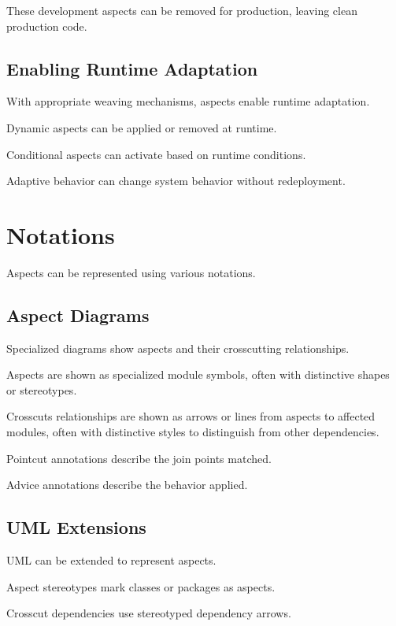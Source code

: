 \documentclass[11pt]{article}
\begin{document}
These development aspects can be removed for production, leaving clean production code.

\subsection{Enabling Runtime Adaptation}

With appropriate weaving mechanisms, aspects enable runtime adaptation.

Dynamic aspects can be applied or removed at runtime.

Conditional aspects can activate based on runtime conditions.

Adaptive behavior can change system behavior without redeployment.

\section{Notations}

Aspects can be represented using various notations.

\subsection{Aspect Diagrams}

Specialized diagrams show aspects and their crosscutting relationships.

Aspects are shown as specialized module symbols, often with distinctive shapes or stereotypes.

Crosscuts relationships are shown as arrows or lines from aspects to affected modules, often with distinctive styles to distinguish from other dependencies.

Pointcut annotations describe the join points matched.

Advice annotations describe the behavior applied.

\subsection{UML Extensions}

UML can be extended to represent aspects.

Aspect stereotypes mark classes or packages as aspects.

Crosscut dependencies use stereotyped dependency arrows.
\end{document}
